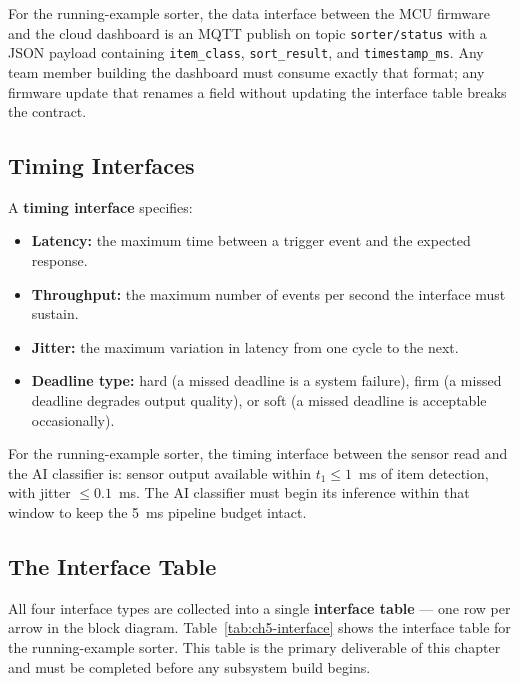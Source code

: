 For the running-example sorter, the data interface between the MCU firmware and the cloud dashboard is an MQTT publish on topic \texttt{sorter/status} with a JSON payload containing \texttt{item\_class}, \texttt{sort\_result}, and \texttt{timestamp\_ms}.
Any team member building the dashboard must consume exactly that format; any firmware update that renames a field without updating the interface table breaks the contract.

\subsection{Timing Interfaces}
\label{subsec:ch5-timing-interface}

A \textbf{timing interface} specifies:
\begin{itemize}
  \item \textbf{Latency:} the maximum time between a trigger event and the expected response.
  \item \textbf{Throughput:} the maximum number of events per second the interface must sustain.
  \item \textbf{Jitter:} the maximum variation in latency from one cycle to the next.
  \item \textbf{Deadline type:} hard (a missed deadline is a system failure), firm (a missed deadline degrades output quality), or soft (a missed deadline is acceptable occasionally).
\end{itemize}

For the running-example sorter, the timing interface between the sensor read and the AI classifier is: sensor output available within $t_1 \leq 1$~ms of item detection, with jitter $\leq 0.1$~ms.
The AI classifier must begin its inference within that window to keep the 5~ms pipeline budget intact.

\subsection{The Interface Table}
\label{subsec:ch5-interface-table}

All four interface types are collected into a single \textbf{interface table} --- one row per arrow in the block diagram.
Table~\ref{tab:ch5-interface} shows the interface table for the running-example sorter.
This table is the primary deliverable of this chapter and must be completed before any subsystem build begins.

